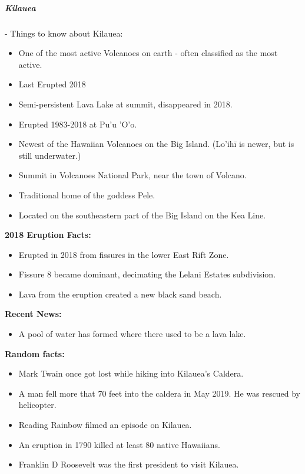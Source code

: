 \documentclass[12pt]{book}
\begin{document}
					\subparagraph{Kilauea} - Things to know about Kilauea: 
						\begin{itemize}
							\item One of the most active Volcanoes on earth - often classified as the most active.
							\item Last Erupted 2018
							\item Semi-persistent Lava Lake at summit, disappeared in 2018.
							\item Erupted 1983-2018 at Pu'u 'O'o.
							\item Newest of the Hawaiian Volcanoes on the Big Island. (Lo'ih\=i is newer, but is still underwater.)
							\item Summit in Volcanoes National Park, near the town of Volcano.
							\item Traditional home of the goddess Pele.
							\item Located on the southeastern part of the Big Island on the Kea Line.
						\end{itemize}
						\textbf{2018 Eruption Facts: }
						\begin{itemize}
							\item Erupted in 2018 from fissures in the lower East Rift Zone. 
							\item Fissure 8 became dominant, decimating the Lelani Estates subdivision.
							\item Lava from the eruption created a new black sand beach. 
						\end{itemize}
						
						\textbf{Recent News: }
						\begin{itemize}
							\item A pool of water has formed where there used to be a lava lake. 
						\end{itemize}
						
						
						\textbf{Random facts:}
						\begin{itemize}
							\item Mark Twain once got lost while hiking into Kilauea's Caldera. 
							\item A man fell more that 70 feet into the caldera in May 2019.  He was rescued by helicopter. 
							\item Reading Rainbow filmed an episode on Kilauea.
							\item An eruption in 1790 killed at least 80 native Hawaiians. 
							\item Franklin D Roosevelt was the first president to visit Kilauea.
						\end{itemize}
				
\end{document}
